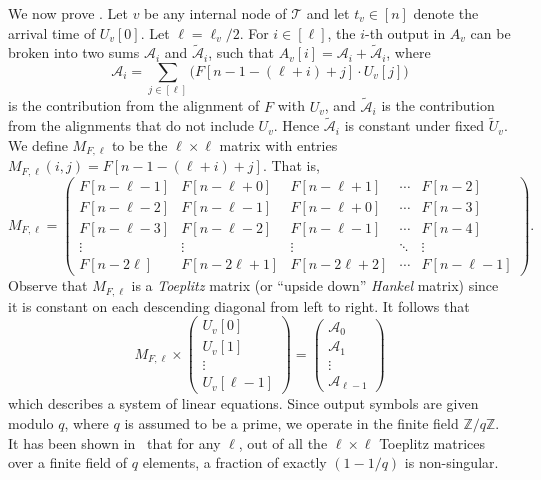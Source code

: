 \documentclass{toc}
\newcommand{\calA}{\ensuremath{\mathcal{A}}}
\newcommand{\calT}{\ensuremath{\mathcal{T}}}
\newcommand{\MFL}{\ensuremath{M_{F,\ell}}}
\newcommand{\Xv}{\ensuremath{U_v}}
\newcommand{\Xvknown}{\ensuremath{\widetilde{U}_v}}
\newcommand{\Yv}{\ensuremath{A_v}}
\begin{document}
We now prove .
Let $v$ be any internal node of $\calT$ and let $t_v\in[n]$ denote the arrival time of $\Xv[0]$.
Let $\ell=\ell_v/2$.
For $i\in [\ell]$, the $i$-th output in $\Yv$ can be broken into two sums $\calA_i$ and $\widetilde{\calA}_i$, such that $\Yv[i] = \calA_i + \widetilde{\calA}_i$, where
%
\begin{equation*}
\calA_i = \sum_{j\in[\ell]} \big(F[n-1-(\ell+i)+j]\cdot U_v[j]\big)
\end{equation*}
%
is the contribution from the alignment of $F$ with $U_v$, and $\widetilde{\calA}_i$ is the contribution from the alignments that do not include $U_v$. Hence $\widetilde{\calA}_i$ is constant under fixed $\Xvknown$.
We define $\MFL$ to be the $\ell \times \ell$ matrix with entries $\MFL(i,j)= F[n-1-(\ell+i)+j]$. That is,
%
\begin{equation*}
\MFL =
\begin{pmatrix}
F[n-\ell-1] & F[n-\ell+0] & F[n-\ell+1] & \cdots & F[n-2] \\
F[n-\ell-2] & F[n-\ell-1] & F[n-\ell+0] & \cdots & F[n-3] \\
F[n-\ell-3] & F[n-\ell-2] & F[n-\ell-1] & \cdots & F[n-4] \\
\vdots  & \vdots & \vdots & \ddots & \vdots  \\
F[n-2\ell] & F[n-2\ell+1] & F[n-2\ell+2] & \cdots & F[n-\ell-1]
\end{pmatrix}.
\end{equation*}
%
Observe that $\MFL$ is a \emph{Toeplitz} matrix (or ``upside down'' \emph{Hankel} matrix) since it is constant on each descending diagonal from left to right.
%
It follows that
%
\begin{equation}
\label{eq:matrix}
\MFL\times
\begin{pmatrix}
U_v[0] \\
U_v[1] \\
\vdots \\
U_v[\ell-1]
\end{pmatrix}
=
\begin{pmatrix}
\calA_0 \\
\calA_1 \\
\vdots \\
\calA_{\ell-1}
\end{pmatrix}
\end{equation}
%
which describes a system of linear equations. Since output symbols are given modulo $q$, where $q$ is assumed to be a prime, we operate in the finite field $\mathbb{Z}/q\mathbb{Z}$.
It has been shown in~\cite{KL1996:Toeplitz} that for any $\ell$, out of all the $\ell \times \ell$ Toeplitz matrices over a finite field of $q$ elements, a fraction of exactly $(1-1/q)$ is non-singular.
\end{document}
